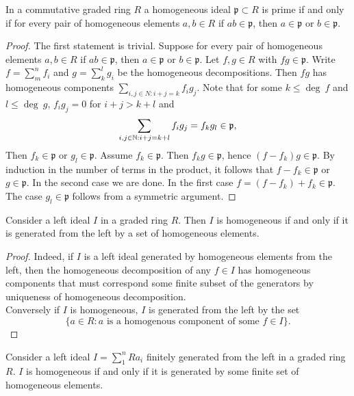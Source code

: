     \begin{lemma}\label{EquivalentPrimeHomogeneousIdealCondition}
        In a commutative graded ring $R$ a homogeneous ideal $\mathfrak{p}\subset R$ is prime if and only if for every pair of homogeneous elements $a,b\in R$ if $ab\in \mathfrak{p}$, then $a\in \mathfrak{p}$ or $b\in \mathfrak{p}$. 
    \end{lemma}
    \begin{proof}
        The first statement is trivial. Suppose for every pair of homogeneous elements $a,b\in R$ if $ab\in \mathfrak{p}$, then $a\in \mathfrak{p}$ or $b\in \mathfrak{p}$. Let $f,g\in R$ with $fg\in \mathfrak{p}$. Write $f= \sum_{m}^n f_i$ and $g=\sum_{k}^l g_i$ be the homogeneous decompositions. Then $fg$ has homogeneous components $\sum_{i,j\in N : i+j=k } f_ig_j$. Note that for some $k\leq \deg \ f$ and $l\leq \deg \ g$, $f_ig_j = 0$ for $i+j>k+l$ and
        $$
            \sum_{i,j\in \mathbb{N} : i+j = k+ l} f_ig_j = f_kg_l\in \mathfrak{p}, 
        $$
        Then $f_k\in \mathfrak{p}$ or $g_l\in \mathfrak{p}$. Assume $f_k\in \mathfrak{p}$. Then $f_kg\in \mathfrak{p}$, hence $(f-f_k)g\in \mathfrak{p}$. By induction in the number of terms in the product, it follows that $f-f_k\in \mathfrak{p}$ or $g\in \mathfrak{p}$. In the second case we are done. In the first case $f=(f-f_k)+f_k\in \mathfrak{p}$. The case $g_l\in \mathfrak{p}$ follows from a symmetric argument.
    \end{proof}
    \begin{lemma}
        Consider a left ideal $I$ in a graded ring $R$. Then $I$ is homogeneous if and only if it is generated from the left by a set of homogeneous elements.  
    \end{lemma}
    \begin{proof}
        Indeed, if $I$ is a left ideal generated by homogeneous elements from the left, then the homogeneous decomposition of any $f\in I$ has homogeneous components that must correspond some finite subset of the generators by uniqueness of homogeneous decomposition.\\
        Conversely if $I$ is homogeneous, $I$ is generated from the left by the set
        $$
            \{a\in R : a \text{ is a homogenous component of some } f\in I\}.
        $$
    \end{proof}
    \begin{lemma}\label{HomogeneousIdealFinitelyGenerated}
        Consider a left ideal $I=\sum_1^n Ra_i$ finitely generated from the left in a graded ring $R$. $I$ is homogeneous if and only if it is generated by some finite set of homogeneous elements.   
    \end{lemma}
